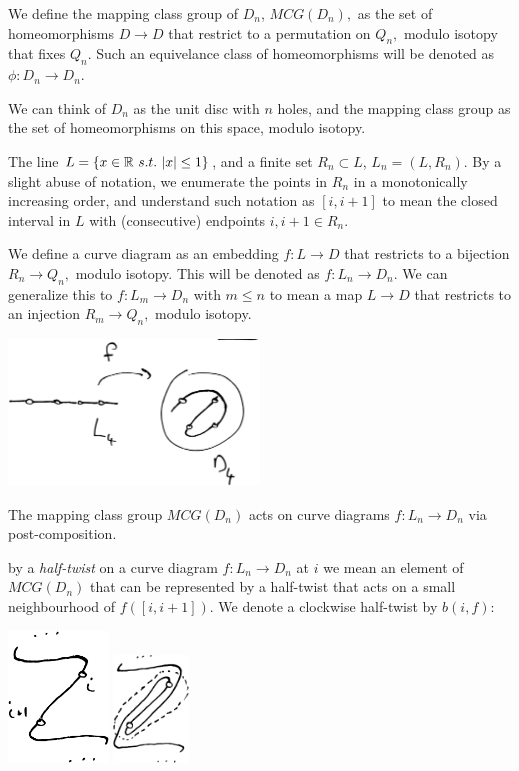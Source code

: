 \documentclass[12pt,a4paper]{article}
\begin{document}
We define the mapping class group of $D_n$,
$MCG(D_n),$ as the set of homeomorphisms $D\to D$ that
restrict to a permutation on $Q_n,$ modulo isotopy that
fixes $Q_n.$
Such an equivelance class
of homeomorphisms will be denoted as $\phi:D_n\to D_n.$

We can think of $D_n$ as the unit disc with $n$ holes,
and the mapping class group as the set of homeomorphisms on
this space, modulo isotopy.

The line $L = \{ x\in \mathbb{R}\ s.t.\ |x|\leq 1 \} $,
and a finite set $R_n\subset L$,
$L_n = (L, R_n).$
By a slight abuse of notation, we enumerate the points in $R_n$ 
in a monotonically increasing order,
and understand such notation as $[i, i+1]$ to mean the closed interval in $L$
with (consecutive) endpoints $i, i+1 \in R_n.$

We define a curve diagram as an embedding $f : L\to D$ that
restricts to a bijection $R_n\to Q_n,$ modulo
isotopy.
This will be denoted as $f : L_n\to D_n.$
We can generalize this to $f : L_m\to D_n$ with $m\leq n$
to mean a map $L\to D$ that restricts to an injection $R_m\to Q_n,$
modulo isotopy.

\begin{center}
\includegraphics[width=0.5\textwidth]{curve-diagram.eps}
\end{center}




The mapping class group $MCG(D_n)$ acts on curve diagrams $f : L_n\to D_n$
via post-composition.

 by a {\it half-twist} on a curve
diagram $f:L_n\to D_n$ at $i$ we mean an element of $MCG(D_n)$
that can be represented by a half-twist that acts
on a small neighbourhood of $f([i, i+1]).$
We denote a clockwise half-twist by $b(i, f):$

\begin{center}
\includegraphics[width=0.2\textwidth]{halftwist-1.eps}
\includegraphics[width=0.15\textwidth]{halftwist-2.eps}
\end{center}
\end{document}
